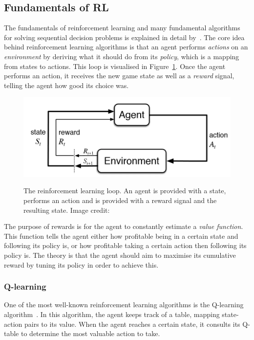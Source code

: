 \documentclass[12pt,a4paper]{article}
\begin{document}
    \subsection{Fundamentals of RL}\label{subsec:fundamentals}
    The fundamentals of reinforcement learning and many fundamental algorithms for solving sequential decision problems is explained in detail by~\citet{sutton18}.
    The core idea behind reinforcement learning algorithms is that an agent performs \emph{actions} on an \emph{environment} by deriving what it should do from its \emph{policy}, which is a mapping from states to actions.
    This loop is visualised in Figure~\ref{fig:rlgraph}.
    Once the agent performs an action, it receives the new game state as well as a \emph{reward} signal, telling the agent how good its choice was.

    \begin{figure}[ht]
        \caption[The reinforcement learning loop.]{The reinforcement learning loop. An agent is provided with a state, performs an action and is provided with a reward signal and the resulting state. Image credit: \citet{bhattrl}}
        \centering
        \includegraphics[scale=0.4]{rlgraph}
        \label{fig:rlgraph}
    \end{figure}

    The purpose of rewards is for the agent to constantly estimate a \emph{value function}.
    This function tells the agent either how profitable being in a certain state and following its policy is, or how profitable taking a certain action then following its policy is.
    The theory is that the agent should aim to maximise its cumulative reward by tuning its policy in order to achieve this.

    \subsubsection{Q-learning}
    One of the most well-known reinforcement learning algorithms is the Q-learning algorithm~\citep[chap.~6.5]{sutton18}.
    In this algorithm, the agent keeps track of a table, mapping state-action pairs to its value.
    When the agent reaches a certain state, it consults its Q-table to determine the most valuable action to take.
\end{document}
